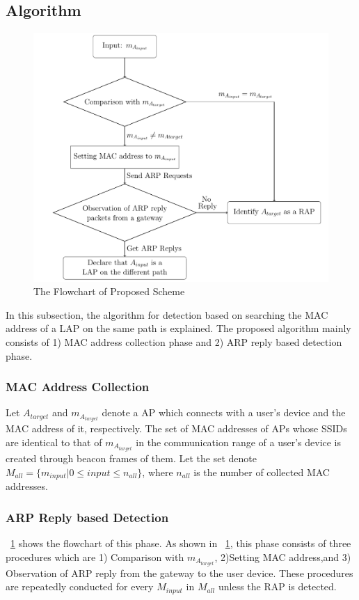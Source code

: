\documentclass[conference]{IEEEtran}
\newcommand{\tarAP}{A_{target}}
\newcommand{\tarMAC}{m_{A_{target}}}
\begin{document}
\subsection{Algorithm}
\begin{figure}[t]
    \begin{center}
        \includegraphics[scale=0.45]{image/flowchart.pdf}
        \caption{The Flowchart of Proposed Scheme}
        \label{fig:flowchart}
    \end{center}
\end{figure}
In this subsection, the algorithm for detection based on searching the MAC address of a LAP on the same path is explained.
The proposed algorithm mainly consists of 1) MAC address collection phase and 2) ARP reply based detection phase. 

\subsubsection{MAC Address Collection}
Let $\tarAP$ and $\tarMAC$ denote a AP which connects with a user's device and the MAC address of it, respectively.
The set of MAC addresses of APs whose SSIDs are identical to that of $\tarMAC$  in the communication range of a user's device is created through beacon frames of them. 
Let the set denote $M_{all}=\{m_{input}|0\le input \le n_{all}  \}$, where $n_{all}$ is the number of collected MAC addresses.

\subsubsection{ARP Reply based Detection}
\figurename~\ref{fig:flowchart} shows the flowchart of this phase.
As shown in \figurename~\ref{fig:flowchart}, this phase consists of three procedures which are 1) Comparison with $\tarMAC$, 2)Setting MAC address,and 3) Observation of ARP reply from the gateway to the user device.
These procedures are repeatedly conducted for every $M_{input}$ in $M_{all}$ unless the RAP is detected.
\end{document}
